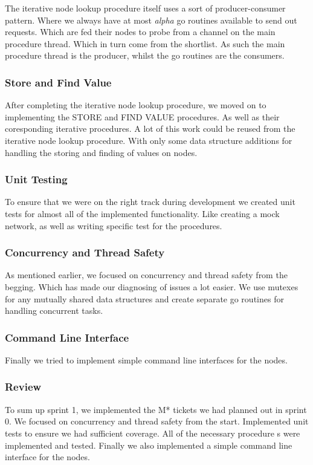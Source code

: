 The iterative node lookup procedure itself uses a sort of producer-consumer pattern. Where we always have at most \textit{alpha} go routines available to send out requests. Which are fed their nodes to probe from a channel on the main procedure thread. Which in turn come from the shortlist. As such the main procedure thread is the producer, whilst the go routines are the consumers.

\subsubsection{Store and Find Value}
After completing the iterative node lookup procedure, we moved on to implementing the STORE and FIND VALUE procedures. As well as their coresponding iterative procedures. A lot of this work could be reused from the iterative node lookup procedure. With only some data structure additions for handling the storing and finding of values on nodes.

\subsubsection{Unit Testing}
To ensure that we were on the right track during development we created unit tests for almost all of the implemented functionality. Like creating a mock network, as well as writing specific test for the procedures.

\subsubsection{Concurrency and Thread Safety}
As mentioned earlier, we focused on concurrency and thread safety from the begging. Which has made our diagnosing of issues a lot easier. We use mutexes for any mutually shared data structures and create separate go routines for handling concurrent tasks.

\subsubsection{Command Line Interface}
Finally we tried to implement simple command line interfaces for the nodes.

\subsubsection{Review}
To sum up sprint 1, we implemented the M* tickets we had planned out in sprint 0. We focused on concurrency and thread safety from the start. Implemented unit tests to ensure we had sufficient coverage. All of the necessary procedure
s were implemented and tested. Finally we also implemented a simple command line interface for the nodes.

